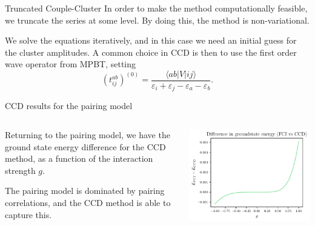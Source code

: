 \documentclass[UKenglish,aspectratio=169]{beamer}
\begin{document}
\begin{frame}{Truncated Couple-Cluster}
    In order to make the method computationally feasible, we truncate the series at some level.
    By doing this, the method is non-variational.

    \bigskip

    We solve the equations iteratively, and in this case we need an initial guess for the cluster amplitudes.
    A common choice in CCD is then to use the first order wave operator from MPBT, setting
    \begin{equation}
        (t_{ij}^{ab})^{(0)} = \frac{
            \langle ab \vert V \vert ij \rangle
        }{
            \varepsilon_i + \varepsilon_j - \varepsilon_a - \varepsilon_b
        }.
    \end{equation}
\end{frame}

\begin{frame}{CCD results for the pairing model}
    \begin{columns}
        \begin{column}{.49\textwidth}
            Returning to the pairing model, we have the ground state energy difference for the CCD method, as a function of the interaction strength $g$.

            \medskip

            The pairing model is dominated by pairing correlations, and the CCD method is able to capture this.
        \end{column}

        \begin{column}{.49\textwidth}
            \includegraphics[width=\textwidth]{../midterm2/figures/ccd_groundstate_energy_diff.pdf}
        \end{column}
    \end{columns}
\end{frame}
\end{document}
